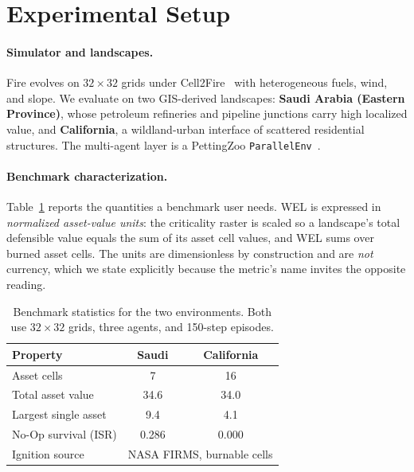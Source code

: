 \documentclass[letterpaper]{article}
\begin{document}
\section{Experimental Setup}
\label{sec:setup}

\paragraph{Simulator and landscapes.} Fire evolves on $32 \times 32$ grids under Cell2Fire~\citep{pais2021cell2fire} with heterogeneous fuels, wind, and slope. We evaluate on two GIS-derived landscapes: \textbf{Saudi Arabia (Eastern Province)}, whose petroleum refineries and pipeline junctions carry high localized value, and \textbf{California}, a wildland-urban interface of scattered residential structures. The multi-agent layer is a PettingZoo \texttt{ParallelEnv}~\citep{terry2021pettingzoo}.

\paragraph{Benchmark characterization.} Table~\ref{tab:bench} reports the quantities a benchmark user needs. WEL is expressed in \emph{normalized asset-value units}: the criticality raster is scaled so a landscape's total defensible value equals the sum of its asset cell values, and WEL sums over burned asset cells. The units are dimensionless by construction and are \emph{not} currency, which we state explicitly because the metric's name invites the opposite reading.

\begin{table}[t]
	\centering
	\caption{Benchmark statistics for the two environments. Both use $32\times32$ grids, three agents, and 150-step episodes.}
	\label{tab:bench}
	\vspace{0.4em}
	\setlength{\tabcolsep}{4pt}\footnotesize
	\begin{tabular}{lcc}
		\toprule
		Property & Saudi & California \\
		\midrule
		Asset cells & 7 & 16 \\
		Total asset value & 34.6 & 34.0 \\
		Largest single asset & 9.4 & 4.1 \\
		No-Op survival (ISR) & 0.286 & 0.000 \\
		Ignition source & \multicolumn{2}{c}{NASA FIRMS, burnable cells} \\
		\bottomrule
	\end{tabular}
\end{table}
\end{document}
